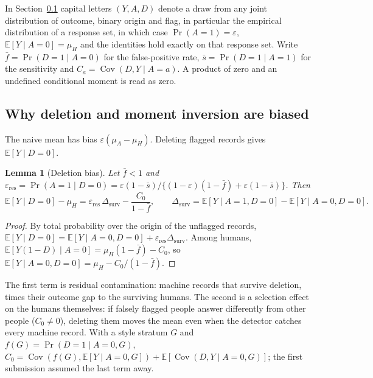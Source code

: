 \documentclass[11pt]{article}
\newtheorem{lemma}{Lemma}
\theoremstyle{definition}
\newcommand{\E}{\mathbb{E}}
\newcommand{\Cov}{\operatorname{Cov}}
\newcommand{\muH}{\mu_H}
\begin{document}
In Section~\ref{sec:bias} capital letters $(Y,A,D)$ denote a draw from any joint
distribution of outcome, binary origin and flag, in particular the empirical distribution
of a response set, in which case $\Pr(A{=}1)=\varepsilon$, $\E[Y\mid A{=}0]=\muH$ and the
identities hold exactly on that response set. Write
$\bar f=\Pr(D{=}1\mid A{=}0)$ for the false-positive rate, $\bar s=\Pr(D{=}1\mid A{=}1)$ for
the sensitivity and $C_a=\Cov(D,Y\mid A=a)$. A product of zero and an undefined conditional
moment is read as zero.

\subsection{Why deletion and moment inversion are biased}\label{sec:bias}
The naive mean has bias $\varepsilon(\mu_A-\muH)$. Deleting flagged records gives
$\E[Y\mid D{=}0]$.

\begin{lemma}[Deletion bias]\label{l:del}
Let $\bar f<1$ and $\varepsilon_{\mathrm{res}}=\Pr(A{=}1\mid D{=}0)
=\varepsilon(1-\bar s)/\{(1-\varepsilon)(1-\bar f)+\varepsilon(1-\bar s)\}$. Then
\begin{equation}\label{eq:del}
\E[Y\mid D{=}0]-\muH
=\varepsilon_{\mathrm{res}}\,\Delta_{\mathrm{surv}}-\frac{C_0}{1-\bar f},
\qquad
\Delta_{\mathrm{surv}}=\E[Y\mid A{=}1,D{=}0]-\E[Y\mid A{=}0,D{=}0].
\end{equation}
\end{lemma}
\begin{proof}
By total probability over the origin of the unflagged records,
$\E[Y\mid D{=}0]=\E[Y\mid A{=}0,D{=}0]+\varepsilon_{\mathrm{res}}\Delta_{\mathrm{surv}}$.
Among humans, $\E[Y(1-D)\mid A{=}0]=\muH(1-\bar f)-C_0$, so
$\E[Y\mid A{=}0,D{=}0]=\muH-C_0/(1-\bar f)$.
\end{proof}
The first term is residual contamination: machine records that survive deletion, times
their outcome gap to the surviving humans. The second is a selection effect on the humans
themselves: if falsely flagged people answer differently from other people ($C_0\neq0$),
deleting them moves the mean even when the detector catches every machine record. With a
style stratum $G$ and $f(G)=\Pr(D{=}1\mid A{=}0,G)$, $C_0=\Cov(f(G),\E[Y\mid A{=}0,G])
+\E[\Cov(D,Y\mid A{=}0,G)]$; the first submission assumed the last term away.
\end{document}
